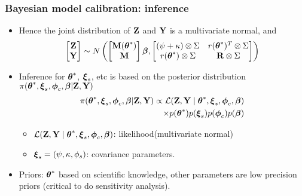 \documentclass{beamer}
\begin{document}
\begin{frame}
 \frametitle{Bayesian model calibration: inference}
    \begin{itemize}
\item Hence the joint distribution of ${\bf Z}$ and ${\bf Y}$ is a multivariate normal, and 
$$ \begin{bmatrix} {\bf Z} \\ {\bf Y} \end{bmatrix} \sim  N \left(
\begin{bmatrix}  \mathbf{M}(\mbox{\boldmath $\theta$}^*) \\ \mathbf{M} \end{bmatrix} \mbox{\boldmath $\beta$},
\begin{bmatrix} 
(\psi+\kappa) \otimes \Sigma & r(\mbox{\boldmath $\theta$}^*)^T \otimes \Sigma \\ r(\mbox{\boldmath $\theta$}^*) \otimes \Sigma &  \mathbf{R} \otimes \Sigma
\end{bmatrix}\right)
$$
\item Inference for $\mbox{\boldmath $\theta$}^*$, $\mbox{\boldmath $\xi$}_{s}$, etc is based on the posterior distribution $\pi(\mbox{\boldmath $\theta$}^*,\mbox{\boldmath $\xi$}_{s},\mbox{\boldmath $\phi$}_c,\mbox{\boldmath $\beta$} |{\bf Z},{\bf Y})$
\begin{equation*}
\begin{split}
\pi(\mbox{\boldmath $\theta$}^*,\mbox{\boldmath $\xi$}_{s},\mbox{\boldmath $\phi$}_c,\mbox{\boldmath $\beta$} |{\bf Z},{\bf Y}) \propto \mathcal{L}({\bf Z},{\bf Y}\mid \mbox{\boldmath $\theta$}^*,\mbox{\boldmath $\xi$}_{s},
 \mbox{\boldmath $\phi$}_c,\mbox{\boldmath $\beta$})\\
 \times p(\mbox{\boldmath $\theta$}^*)p(\mbox{\boldmath $\xi$}_{s})p(\mbox{\boldmath $\phi$}_c)p(\mbox{\boldmath $\beta$})
 \end{split}
  \end{equation*}
  \begin{itemize}
\item $\mathcal{L}({\bf Z},{\bf Y} \mid \mbox{\boldmath $\theta$}^*,\mbox{\boldmath $\xi$}_{s},\mbox{\boldmath $\phi$}_c,\mbox{\boldmath $\beta$})$: likelihood(multivariate normal)
\item $\mbox{\boldmath $\xi$}_{s}=(\psi,\kappa,\phi_s)$: covariance parameters.  
      \end{itemize}
\item Priors: $\mbox{\boldmath $\theta$}^*$ based on scientific knowledge, other parameters are low precision priors (critical to do sensitivity analysis).

      \end{itemize}
\end{frame}
\end{document}
